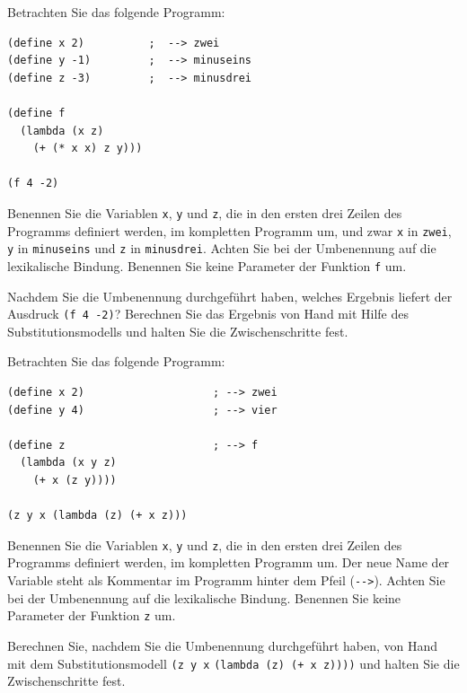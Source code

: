 \begin{aufgabe}

  Betrachten Sie das folgende Programm:

\begin{verbatim}
(define x 2)          ;  --> zwei
(define y -1)         ;  --> minuseins
(define z -3)         ;  --> minusdrei

(define f 
  (lambda (x z)
    (+ (* x x) z y)))

(f 4 -2)
\end{verbatim}
  Benennen Sie die Variablen \verb"x", \verb"y" und \verb"z", die in
  den ersten drei Zeilen des Programms definiert werden, im kompletten
  Programm um, und zwar \verb|x| in \verb|zwei|, \verb|y| in
  \verb|minuseins| und \verb|z| in \verb|minusdrei|. Achten Sie bei
  der Umbenennung auf die lexikalische Bindung.  Benennen Sie keine
  Parameter der Funktion \verb"f" um.

  Nachdem Sie die Umbenennung durchgeführt haben, welches Ergebnis liefert
  der Ausdruck \verb"(f 4 -2)"? Berechnen Sie das Ergebnis von Hand mit Hilfe
  des Substitutionsmodells und halten Sie die Zwischenschritte fest.
\end{aufgabe}

\begin{aufgabe}

  Betrachten Sie das folgende Programm:

\begin{verbatim}
(define x 2)                    ; --> zwei
(define y 4)                    ; --> vier

(define z                       ; --> f
  (lambda (x y z)
    (+ x (z y))))

(z y x (lambda (z) (+ x z)))
\end{verbatim}
%
  Benennen Sie die Variablen \verb"x", \verb"y" und \verb"z", die in
  den ersten drei Zeilen des Programms definiert werden, im kompletten
  Programm um. Der neue Name der Variable steht als Kommentar im
  Programm hinter dem Pfeil (\verb"-->").  Achten Sie bei der
  Umbenennung auf die lexikalische Bindung.  Benennen Sie keine
  Parameter der Funktion \verb"z" um.

  Berechnen Sie, nachdem Sie die Umbenennung durchgeführt haben, von
  Hand mit dem Substitutionsmodell \verb"(z y x"
  \verb"(lambda (z) (+ x z))))" und halten Sie die Zwischenschritte
  fest.

\end{aufgabe}

